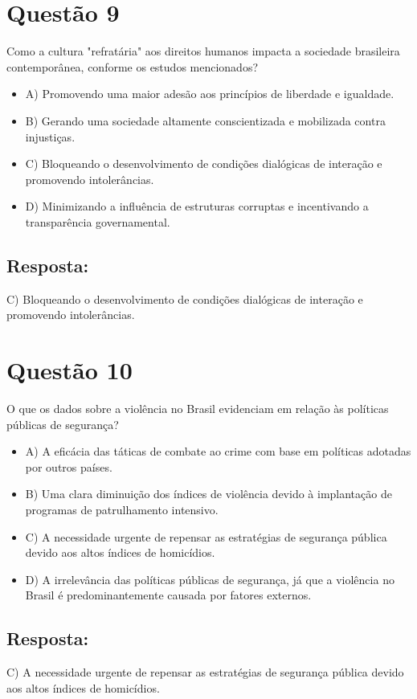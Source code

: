 \documentclass[
   article,       
   12pt,          
   oneside,       
   a4paper,       
   english,       
   brazil,        
   sumario=tradicional
   ]{abntex2}
\begin{document}
\section{Questão 9}
Como a cultura "refratária" aos direitos humanos impacta a sociedade brasileira contemporânea, conforme os estudos mencionados?
\begin{itemize}
    \item A) Promovendo uma maior adesão aos princípios de liberdade e igualdade.
    \item B) Gerando uma sociedade altamente conscientizada e mobilizada contra injustiças.
    \item C) Bloqueando o desenvolvimento de condições dialógicas de interação e promovendo intolerâncias.
    \item D) Minimizando a influência de estruturas corruptas e incentivando a transparência governamental.
\end{itemize}
\subsection{Resposta:} 
C) Bloqueando o desenvolvimento de condições dialógicas de interação e promovendo intolerâncias.

\section{Questão 10}
O que os dados sobre a violência no Brasil evidenciam em relação às políticas públicas de segurança?
\begin{itemize}
    \item A) A eficácia das táticas de combate ao crime com base em políticas adotadas por outros países.
    \item B) Uma clara diminuição dos índices de violência devido à implantação de programas de patrulhamento intensivo.
    \item C) A necessidade urgente de repensar as estratégias de segurança pública devido aos altos índices de homicídios.
    \item D) A irrelevância das políticas públicas de segurança, já que a violência no Brasil é predominantemente causada por fatores externos.
\end{itemize}
\subsection{Resposta:}
C) A necessidade urgente de repensar as estratégias de segurança pública devido aos altos índices de homicídios.
\postextual

\end{document}
